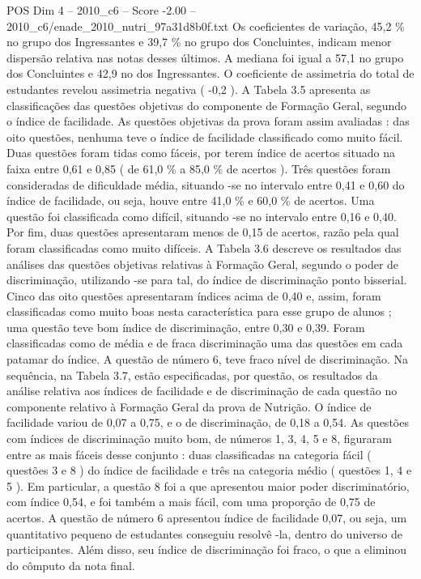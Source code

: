 \begin{textsample}{POS Dim 4 – 2010\_c6 – Score -2.00 – 2010\_c6/enade\_2010\_nutri\_97a31d8b0f.txt}
Os coeficientes de variação, 45,2 \% no grupo dos Ingressantes e 39,7 \% no grupo dos Concluintes, indicam menor dispersão relativa nas notas desses últimos.
A mediana foi igual a 57,1 no grupo dos Concluintes e 42,9 no dos Ingressantes.
O coeficiente de assimetria do total de estudantes revelou assimetria negativa ( -0,2 ).
A Tabela 3.5 apresenta as classificações das questões objetivas do componente de Formação Geral, segundo o índice de facilidade.
As questões objetivas da prova foram assim avaliadas : das oito questões, nenhuma teve o índice de facilidade classificado como muito fácil.
Duas questões foram tidas como fáceis, por terem índice de acertos situado na faixa entre 0,61 e 0,85 ( de 61,0 \% a 85,0 \% de acertos ).
Três questões foram consideradas de dificuldade média, situando -se no intervalo entre 0,41 e 0,60 do índice de facilidade, ou seja, houve entre 41,0 \% e 60,0 \% de acertos.
Uma questão foi classificada como difícil, situando -se no intervalo entre 0,16 e 0,40.
Por fim, duas questões apresentaram menos de 0,15 de acertos, razão pela qual foram classificadas como muito difíceis.
A Tabela 3.6 descreve os resultados das análises das questões objetivas relativas à Formação Geral, segundo o poder de discriminação, utilizando -se para tal, do índice de discriminação ponto bisserial.
Cinco das oito questões apresentaram índices acima de 0,40 e, assim, foram classificadas como muito boas nesta característica para esse grupo de alunos ; uma questão teve bom índice de discriminação, entre 0,30 e 0,39.
Foram classificadas como de média e de fraca discriminação uma das questões em cada patamar do índice.
A questão de número 6, teve fraco nível de discriminação.
Na sequência, na Tabela 3.7, estão especificadas, por questão, os resultados da análise relativa aos índices de facilidade e de discriminação de cada questão no componente relativo à Formação Geral da prova de Nutrição.
O índice de facilidade variou de 0,07 a 0,75, e o de discriminação, de 0,18 a 0,54.
As questões com índices de discriminação muito bom, de números 1, 3, 4, 5 e 8, figuraram entre as mais fáceis desse conjunto : duas classificadas na categoria fácil ( questões 3 e 8 ) do índice de facilidade e três na categoria médio ( questões 1, 4 e 5 ).
Em particular, a questão 8 foi a que apresentou maior poder discriminatório, com índice 0,54, e foi também a mais fácil, com uma proporção de 0,75 de acertos.
A questão de número 6 apresentou índice de facilidade 0,07, ou seja, um quantitativo pequeno de estudantes conseguiu resolvê -la, dentro do universo de participantes.
Além disso, seu índice de discriminação foi fraco, o que a eliminou do cômputo da nota final.

\end{textsample}
